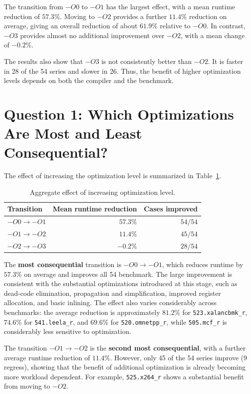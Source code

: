 \documentclass[11pt,a4paper]{article}
\newcommand{\bench}[1]{\texttt{#1}}
\begin{document}
The transition from $-O0$ to $-O1$ has the largest effect, with a mean runtime reduction of $57.3\%$. Moving to $-O2$ provides a further $11.4\%$ reduction on average, giving an overall reduction of about $61.9\%$ relative to $-O0$. In contrast, $-O3$ provides almost no additional improvement over $-O2$, with a mean change of $-0.2\%$.

The results also show that $-O3$ is not consistently better than $-O2$. It is faster in 28 of the 54 series and slower in 26. Thus, the benefit of higher optimization levels depends on both the compiler and the benchmark.

\section{Question 1: Which Optimizations Are Most and Least Consequential?}

The effect of increasing the optimization level is summarized in
Table~\ref{tab:opt_effect2}.

\begin{table}[H]
\centering
\caption{Aggregate effect of increasing optimization level.}
\label{tab:opt_effect2}
\begin{tabular}{lrr}
\toprule
Transition & Mean runtime reduction & Cases improved \\
\midrule
$-O0\rightarrow-O1$ & $57.3\%$ & $54/54$ \\
$-O1\rightarrow-O2$ & $11.4\%$ & $45/54$ \\
$-O2\rightarrow-O3$ & $-0.2\%$ & $28/54$ \\
\bottomrule
\end{tabular}
\end{table}

The \textbf{most consequential} transition is $-O0\rightarrow-O1$, which
reduces runtime by $57.3\%$ on average and improves all 54
benchmark. The large improvement is consistent with
the substantial optimizations introduced at this stage, such as
dead-code elimination, propagation and simplification, improved register
allocation, and basic inlining. The effect also varies considerably across
benchmarks: the average reduction is approximately $81.2\%$ for
\bench{523.xalancbmk\_r}, $74.6\%$ for \bench{541.leela\_r}, and $69.6\%$ for
\bench{520.omnetpp\_r}, while \bench{505.mcf\_r} is considerably less
sensitive to optimization.

The transition $-O1\rightarrow-O2$ is the \textbf{second most consequential},
with a further average runtime reduction of $11.4\%$. However, only 45 of the
54 series improve (9 regress), showing that the benefit of additional optimization is
already becoming more workload dependent. For example,
\bench{525.x264\_r} shows a substantial benefit from moving to $-O2$.
\end{document}
